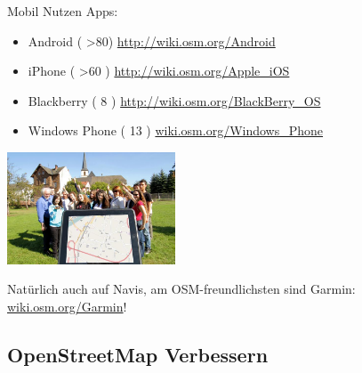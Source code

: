 \documentclass{beamer}
\begin{document}
\begin{frame}{Mobil Nutzen}
	Apps:
 
 \begin{itemize}
   \item  Android ( \textgreater 80) \url{http://wiki.osm.org/Android}
   \item  iPhone ( \textgreater 60 )  \url{http://wiki.osm.org/Apple\_iOS}
   \item  Blackberry ( 8 ) \url{http://wiki.osm.org/BlackBerry\_OS}
   \item  Windows Phone ( 13 ) \href{http://wiki.osm.org/Windows\_Phone}{wiki.osm.org/Windows\_Phone}
 \end{itemize}
 
 \begin{center}
 \includegraphics[width=5cm]{tablet.jpg}
 \end{center}

 Natürlich auch auf Navis, am OSM-freundlichsten sind Garmin: \href{http://wiki.osm.org/Garmin}{wiki.osm.org/Garmin}!

\end{frame}

  \subsection{ OpenStreetMap Verbessern}
\end{document}
